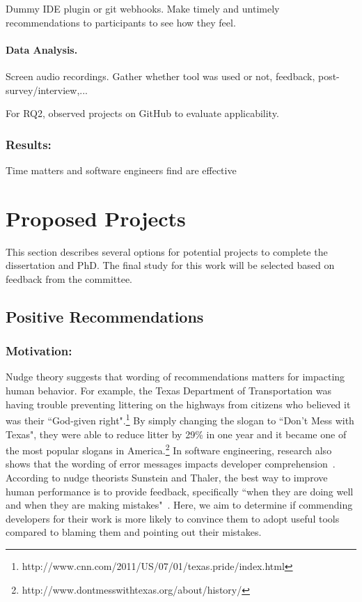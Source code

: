 Dummy IDE plugin or git webhooks. Make timely and untimely recommendations to participants to see how they feel.

\paragraph{Data Analysis.}

Screen audio recordings. Gather whether tool was used or not, feedback, post-survey/interview,...

For RQ2, observed projects on GitHub to evaluate applicability.

\subsubsection{Results:} 

Time matters and software engineers find \timing are effective

\section{Proposed Projects}

This section describes several options for potential projects to complete the dissertation and PhD. The final study for this work will be selected based on feedback from the committee.

\subsection{Positive Recommendations}

\subsubsection{Motivation:}

Nudge theory suggests that wording of recommendations matters for impacting human behavior. For example, the Texas Department of Transportation was having trouble preventing littering on the highways from citizens who believed it was their ``God-given right".\footnote{http://www.cnn.com/2011/US/07/01/texas.pride/index.html} By simply changing the slogan to ``Don't Mess with Texas", they were able to reduce litter by 29\% in one year and it became one of the most popular slogans in America.\footnote{http://www.dontmesswithtexas.org/about/history/} In software engineering, research also shows that the wording of error messages impacts developer comprehension~\cite{barik2018should,becker2016effective}.  According to nudge theorists Sunstein and Thaler, the best way to improve human performance is to provide feedback, specifically ``when they are doing well and when they are making mistakes"~\cite[p.~92]{sunstein2008nudge}. Here, we aim to determine if commending developers for their work is more likely to convince them to adopt useful tools compared to blaming them and pointing out their mistakes.

